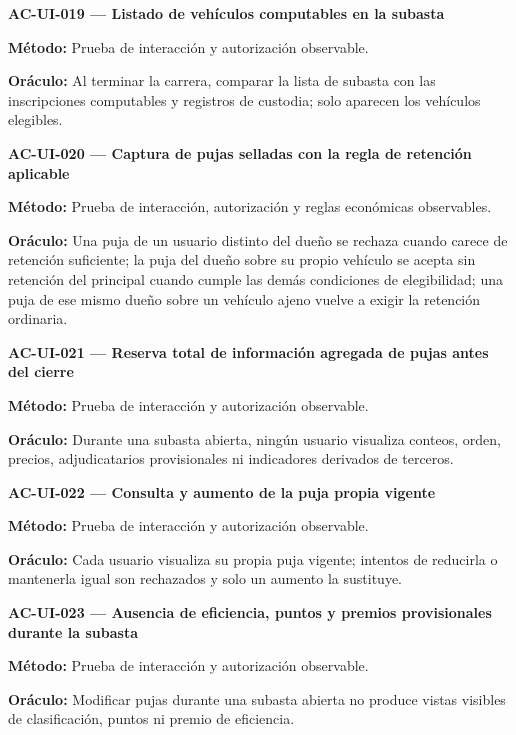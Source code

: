 \documentclass[10pt,letterpaper]{article}
\begin{document}
\noindent\textbf{AC-UI-019 --- Listado de vehículos computables en la subasta}\par
\textbf{Método:} Prueba de interacción y autorización observable.\par
\textbf{Oráculo:} Al terminar la carrera, comparar la lista de subasta con las inscripciones computables y registros de custodia; solo aparecen los vehículos elegibles.\par\vspace{0.45em}
\noindent\textbf{AC-UI-020 --- Captura de pujas selladas con la regla de retención aplicable}\par
\textbf{Método:} Prueba de interacción, autorización y reglas económicas observables.\par
\textbf{Oráculo:} Una puja de un usuario distinto del dueño se rechaza cuando carece de retención suficiente; la puja del dueño sobre su propio vehículo se acepta sin retención del principal cuando cumple las demás condiciones de elegibilidad; una puja de ese mismo dueño sobre un vehículo ajeno vuelve a exigir la retención ordinaria.\par\vspace{0.45em}
\noindent\textbf{AC-UI-021 --- Reserva total de información agregada de pujas antes del cierre}\par
\textbf{Método:} Prueba de interacción y autorización observable.\par
\textbf{Oráculo:} Durante una subasta abierta, ningún usuario visualiza conteos, orden, precios, adjudicatarios provisionales ni indicadores derivados de terceros.\par\vspace{0.45em}
\noindent\textbf{AC-UI-022 --- Consulta y aumento de la puja propia vigente}\par
\textbf{Método:} Prueba de interacción y autorización observable.\par
\textbf{Oráculo:} Cada usuario visualiza su propia puja vigente; intentos de reducirla o mantenerla igual son rechazados y solo un aumento la sustituye.\par\vspace{0.45em}
\noindent\textbf{AC-UI-023 --- Ausencia de eficiencia, puntos y premios provisionales durante la subasta}\par
\textbf{Método:} Prueba de interacción y autorización observable.\par
\textbf{Oráculo:} Modificar pujas durante una subasta abierta no produce vistas visibles de clasificación, puntos ni premio de eficiencia.\par\vspace{0.45em}
\end{document}
